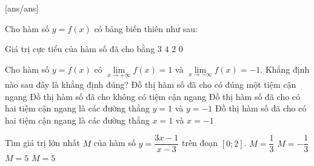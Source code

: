 \begin{name}
	{\tenchude}
	{\tendethi}
	{\tentruong}
	{\thoigian}
\end{name}
\TN
{}[ans/ans\currfilebase]
\begin{ex}%
	Cho hàm số $y=f(x)$ có bảng biến thiên như sau:
	\begin{center}
	\end{center}
	Giá trị cực tiểu của hàm số đã cho bằng
	\choice
	{$3$}
	{\True $4$}
	{$2$}
	{$0$}
\end{ex}


\begin{ex}%
Cho hàm số $y=f(x)$ có $\lim\limits_{x\to+\infty}f(x)=1$ và  $\lim\limits_{x\to-\infty}f(x)=-1$. Khẳng định nào sau đây là khẳng định đúng?
	\choice
	{Đồ thị hàm số đã cho có đúng một tiệm cận ngang}
	{Đồ thị hàm số đã cho không có tiệm cận ngang}
	{\True Đồ thị hàm số đã cho có hai tiệm cận ngang là các đường thẳng $y=1$ và $y=-1$}
	{Đồ thị hàm số đã cho có hai tiệm cận ngang là các đường thẳng $x=1$ và $x=-1$}
\end{ex}


\begin{ex}%
Tìm giá trị lớn nhất $M$ của hàm số $y=\dfrac{3x-1}{x-3}$ trên đoạn $[0;2]$.
	\choice
	{\True $M=\dfrac{1}{3}$}
	{$M=-\dfrac{1}{3}$}
	{$M=5$}
	{$M=5$}
\end{ex}

